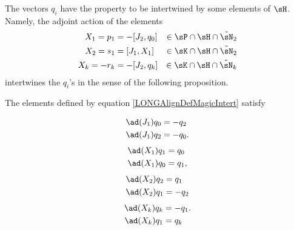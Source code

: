 The vectors $q_i$ have the property to be intertwined by some elements of $\sH$. Namely, the adjoint action of the elements 
%
\begin{subequations}\label{LONGAlignDefMagicIntert}
	\begin{align}
		X_1=p_1&=-[J_2,q_0]	&\in\sP\cap\sH\cap\tilde\sN_2\\
		X_2=s_1&=[J_1,X_1]	&\in\sK\cap\sH\cap\tilde\sN_2\\
		X_k=-r_k&=-[J_2,q_k]	&\in\sK\cap\sH\cap\tilde\sN_k				\label{LONGEqDefXkCommeComm}
	\end{align}
\end{subequations}%
%
intertwines the $q_i$'s in the sense of the following proposition.
%
\begin{proposition}			\label{LONGXUnALaTwistingSuperCool}
	The elements defined by equation \eqref{LONGAlignDefMagicIntert} satisfy
	\begin{multicols}{2}
		\begin{subequations}				\label{LONGEqCalculBBBJUnUnNirme}
			\begin{align}
				\ad(J_1)q_0&=-q_2		\label{LONGEqCalculBBBJUnUnNirmeA}\\
				\ad(J_1)q_2&=-q_0.		\label{LONGEqCalculBBBJUnUnNirmeB}
			\end{align}
		\end{subequations}
		\begin{subequations}				\label{LONGEqSubEqbXUnqZero}
			\begin{align}
				\ad(X_1)q_1&=q_0		\label{LONGSubEqbXZeroqUn}\\
				\ad(X_1)q_0&=q_1,		\label{LONGSubEqbXUnqZero}
			\end{align}
		\end{subequations}
		\begin{subequations}
			\begin{align}
				\ad(X_2)q_2&=q_1		\label{LONGSubEqXdeuxQdeuxa}\\
				\ad(X_2)q_1&=-q_2		\label{LONGSubEqXdeuxQun}
			\end{align}
		\end{subequations}
		\begin{subequations}				\label{LONGEqSubEqbXkqZero}
			\begin{align}
				\ad(X_k)q_k&=-q_1.		\label{LONGSubEqbXIMoinsqZero}\\
				\ad(X_k)q_1&=q_k		\label{LONGSubEqbXkQunQk}
			\end{align}
		\end{subequations}
	\end{multicols}
\end{proposition}


